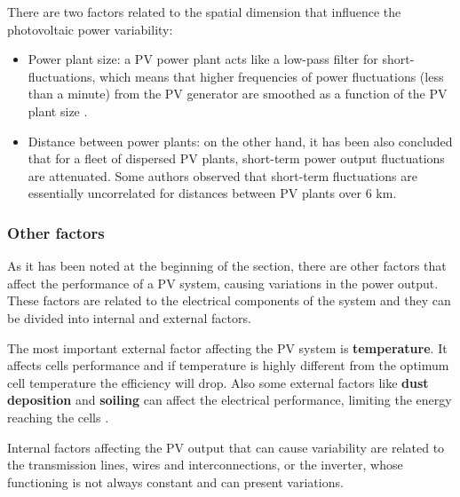 There are two factors related to the spatial dimension that influence the photovoltaic power variability:

\begin{itemize}
\item Power plant size:
  a PV power plant acts like a low-pass filter for short-fluctuations, which means that higher frequencies of power fluctuations (less than a minute) from the PV generator are smoothed as a function of the PV plant size \cite*{Perpinan2011, Perpinan.Marcos.ea2013}.
\item Distance between power plants:
  on the other hand, it has been also concluded that for a fleet of dispersed PV plants, short-term power output fluctuations are attenuated. Some authors observed that short-term fluctuations are essentially uncorrelated for distances between PV plants over 6 km.\cite*{Otani1997, Wiemken2001, Hoff2012}
\end{itemize}


\subsubsection{Other factors}

As it has been noted at the beginning of the section, there are other factors that affect the performance of a PV system, causing variations in the power output. These factors are related to the electrical components of the system and they can be divided into internal and external factors.

The most important external factor affecting the PV system is \textbf{temperature}. It affects cells performance and if temperature is highly different from the optimum cell temperature the efficiency will drop. Also some external factors like \textbf{dust deposition} and \textbf{soiling} can affect the electrical performance, limiting the energy reaching the cells \cite*{Fan1986, Mekhilef2012,Dubey2013}.

Internal factors affecting the PV output that can cause variability are related to the transmission lines, wires and interconnections, or the inverter, whose functioning is not always constant and can present variations.

